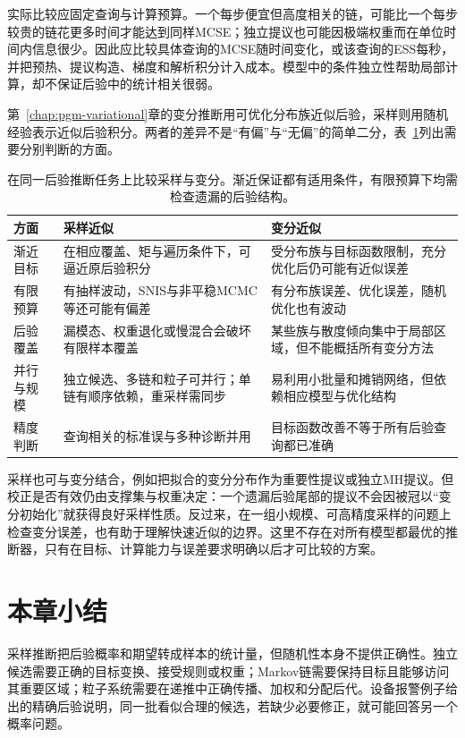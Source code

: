 实际比较应固定查询与计算预算。一个每步便宜但高度相关的链，可能比一个每步较贵的链花更多时间才能达到同样MCSE；独立提议也可能因极端权重而在单位时间内信息很少。因此应比较具体查询的MCSE随时间变化，或该查询的ESS每秒，并把预热、提议构造、梯度和解析积分计入成本。模型中的条件独立性帮助局部计算，却不保证后验中的统计相关很弱。

第~\ref{chap:pgm-variational}章的变分推断用可优化分布族近似后验，采样则用随机经验表示近似后验积分。两者的差异不是“有偏”与“无偏”的简单二分，表~\ref{tab:pgm-sampling-vi-comparison}列出需要分别判断的方面。

\begin{table}[htbp]
  \centering
  \begin{tabularx}{\linewidth}{@{}lXX@{}}
    \toprule
    方面 & 采样近似 & 变分近似\\
    \midrule
    渐近目标 & 在相应覆盖、矩与遍历条件下，可逼近原后验积分 & 受分布族与目标函数限制，充分优化后仍可能有近似误差\\
    有限预算 & 有抽样波动，SNIS与非平稳MCMC等还可能有偏差 & 有分布族误差、优化误差，随机优化也有波动\\
    后验覆盖 & 漏模态、权重退化或慢混合会破坏有限样本覆盖 & 某些族与散度倾向集中于局部区域，但不能概括所有变分方法\\
    并行与规模 & 独立候选、多链和粒子可并行；单链有顺序依赖，重采样需同步 & 易利用小批量和摊销网络，但依赖相应模型与优化结构\\
    精度判断 & 查询相关的标准误与多种诊断并用 & 目标函数改善不等于所有后验查询都已准确\\
    \bottomrule
  \end{tabularx}
  \caption{在同一后验推断任务上比较采样与变分。渐近保证都有适用条件，有限预算下均需检查遗漏的后验结构。}
  \label{tab:pgm-sampling-vi-comparison}
\end{table}

采样也可与变分结合，例如把拟合的变分分布作为重要性提议或独立MH提议。但校正是否有效仍由支撑集与权重决定：一个遗漏后验尾部的提议不会因被冠以“变分初始化”就获得良好采样性质。反过来，在一组小规模、可高精度采样的问题上检查变分误差，也有助于理解快速近似的边界。这里不存在对所有模型都最优的推断器，只有在目标、计算能力与误差要求明确以后才可比较的方案。

\section{本章小结}
\label{sec:pgm-sampling-summary}

采样推断把后验概率和期望转成样本的统计量，但随机性本身不提供正确性。独立候选需要正确的目标变换、接受规则或权重；Markov链需要保持目标且能够访问其重要区域；粒子系统需要在递推中正确传播、加权和分配后代。设备报警例子给出的精确后验说明，同一批看似合理的候选，若缺少必要修正，就可能回答另一个概率问题。

